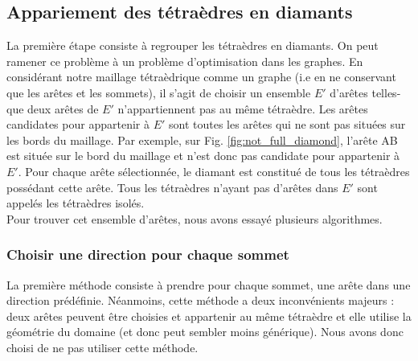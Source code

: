 \subsection{Appariement des tétraèdres en diamants}
\noindent
La première étape consiste à regrouper les tétraèdres en diamants. On peut ramener ce problème à un problème d'optimisation dans les graphes. En considérant notre maillage tétraèdrique comme un graphe (i.e en ne conservant que les arêtes et les sommets), il s'agit de choisir un ensemble $E'$ d'arêtes telles-que deux arêtes de $E'$ n'appartiennent pas au même tétraèdre. Les arêtes candidates pour appartenir à $E'$ sont toutes les arêtes qui ne sont pas situées sur les bords du maillage. Par exemple, sur Fig. \ref{fig:not_full_diamond}, l'arête AB est située sur le bord du maillage et n'est donc pas candidate pour appartenir à $E'$. Pour chaque arête sélectionnée, le diamant est constitué de tous les tétraèdres possédant cette arête. Tous les tétraèdres n'ayant pas d'arêtes dans $E'$ sont appelés les tétraèdres isolés.\\
Pour trouver cet ensemble d'arêtes, nous avons essayé plusieurs algorithmes.
\subsubsection{Choisir une direction pour chaque sommet}
\noindent
La première méthode consiste à prendre pour chaque sommet, une arête dans une direction prédéfinie. Néanmoins, cette méthode a deux inconvénients majeurs : deux arêtes peuvent être choisies et appartenir au même tétraèdre et elle utilise la géométrie du domaine (et donc peut sembler moins générique). Nous avons donc choisi de ne pas utiliser cette méthode.

